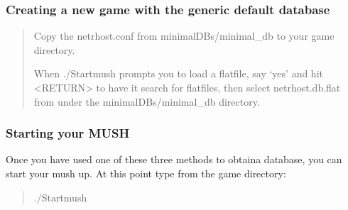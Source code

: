\documentclass[letterpaper,10pt,english]{sphinxmanual}
\begin{document}
\subsubsection{Creating a new game with the generic default database}
\label{\detokenize{installation:creating-a-new-game-with-the-generic-default-database}}\begin{quote}

\sphinxAtStartPar
Copy the netrhost.conf from minimal\sphinxhyphen{}DBs/minimal\_db to your game directory.

\sphinxAtStartPar
When ./Startmush prompts you to load a flatfile, say ‘yes’ and hit \textless{}RETURN\textgreater{}
to have it search for flatfiles, then select netrhost.db.flat from under
the minimal\sphinxhyphen{}DBs/minimal\_db directory.
\end{quote}


\subsubsection{Starting your MUSH}
\label{\detokenize{installation:starting-your-mush}}
\sphinxAtStartPar
Once you have used one of these three methods to obtaina database, you can start your mush up.
At this point type from the game directory:
\begin{quote}

\sphinxAtStartPar
./Startmush
\end{quote}
\end{document}
